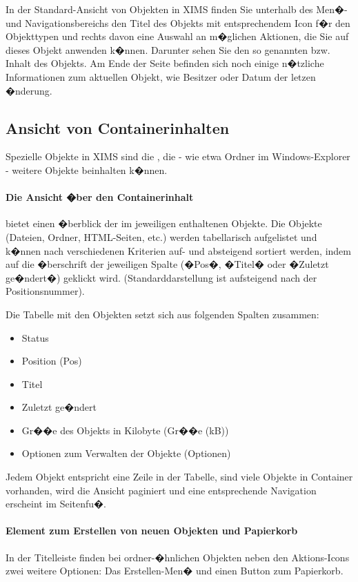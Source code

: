 In der Standard-Ansicht von Objekten in XIMS finden Sie unterhalb des Men�- und Navigationsbereichs den Titel des Objekts mit entsprechendem Icon f�r den Objekttypen und rechts davon eine Auswahl an m�glichen Aktionen, die Sie auf dieses Objekt anwenden k�nnen. Darunter sehen Sie den so genannten  bzw. Inhalt des Objekts. Am Ende der Seite befinden sich noch einige n�tzliche Informationen zum aktuellen Objekt, wie Besitzer oder Datum der letzen �nderung.

\subsection{Ansicht von Containerinhalten}
\label{containeransicht}
Spezielle Objekte in XIMS sind die , die - wie etwa Ordner im Windows-Explorer - weitere Objekte beinhalten k�nnen.

\paragraph{Die Ansicht �ber den Containerinhalt} bietet einen �berblick der im jeweiligen  enthaltenen Objekte. Die Objekte
(Dateien, Ordner, HTML-Seiten, etc.) werden tabellarisch aufgelistet und k�nnen nach verschiedenen Kriterien auf- und absteigend sortiert
werden, indem auf die �berschrift der jeweiligen Spalte (�Pos�, �Titel� oder �Zuletzt ge�ndert�) geklickt wird. (Standarddarstellung ist
aufsteigend nach der Positionsnummer).

Die Tabelle mit den Objekten setzt sich aus folgenden Spalten zusammen:

\begin{itemize}
\item Status
\item Position (Pos)
\item Titel
\item Zuletzt ge�ndert 
\item Gr��e des Objekts in Kilobyte (Gr��e (kB))
\item Optionen zum Verwalten der Objekte (Optionen)
\end{itemize}

Jedem Objekt entspricht eine Zeile in der Tabelle, sind viele Objekte
in Container vorhanden, wird die Ansicht paginiert und eine
entsprechende Navigation erscheint im Seitenfu�.

\paragraph{Element zum Erstellen von neuen Objekten und Papierkorb}
\label{newobject}
In der Titelleiste finden bei ordner-�hnlichen Objekten neben den Aktions-Icons zwei weitere Optionen: Das Erstellen-Men� und einen Button zum Papierkorb.

